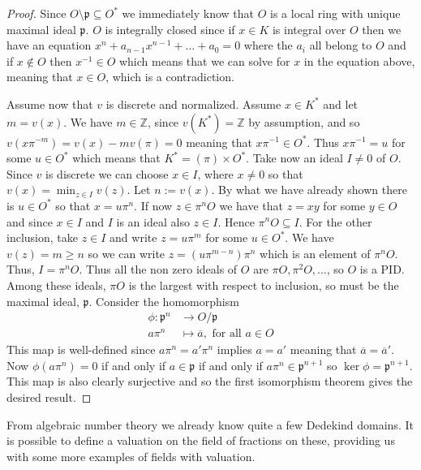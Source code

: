 \documentclass{article}
\newcommand{\mfrak}[1]{\mathfrak{#1}}
\newcommand{\mbb}[1]{\mathbb{#1}}
\numberwithin{equation}{section}
\begin{document}
\begin{proof}
    Since $O \setminus \mfrak p \subseteq O^*$ we immediately know that $O$ is a local ring with unique maximal ideal $\mfrak p$.   $O$ is integrally closed since if $x \in K$ is integral over $O$ then we have an equation $x^n + a_{n-1}x^{n-1} + ... + a_0 = 0$ where the $a_i$ all belong to $O$ and if $x \notin O$ then $x^{-1} \in O$ which means that we can solve for $x$ in the equation above, meaning that $x \in O$, which is a contradiction. 

    Assume now that $v$ is discrete and normalized. Assume $x \in K^*$ and let $m = v(x)$. We have $m \in \mbb Z$, since $v(K^*) = \mbb Z$ by assumption, and so $v(x \pi^{-m}) = v(x) - mv(\pi) = 0$ meaning that $x \pi^{-1} \in O^*$. Thus $x \pi^{-1} = u$ for some $u \in O^*$ which means that $K^* = (\pi) \times O^*$. Take now an ideal $I \neq 0$ of $O$. Since $v$ is discrete we can choose $x \in I$, where $x \neq 0$ so that $v(x) = \min_{z \in I}v(z)$. Let $n := v(x)$. By what we have already shown there is $u \in O^*$ so that $x = u\pi^n$. If now $z \in \pi^n O$ we have that $z = xy$ for some $y \in O$ and since $x \in I$ and $I$ is an ideal also $z \in I$. Hence $\pi^n O \subseteq I$. For the other inclusion, take $z \in I$ and write $z = u \pi^m$ for some $u \in O^*$. We have $v(z) = m \geq n$ so we can write $z = (u \pi^{m-n}) \pi^n$ which is an element of $\pi^n O$. Thus, $I = \pi^n O$. Thus all the non zero ideals of $O$ are $\pi O, \pi^2 O, ...$, so $O$ is a PID. Among these ideals, $\pi O$ is the largest with respect to inclusion, so must be the maximal ideal, $\mfrak p$. Consider the homomorphism
    \begin{align*}
        \phi : \mfrak p^n & \to O / \mfrak p                              \\
        a \pi^n           & \mapsto \overline a, \text{ for all } a \in O
    \end{align*}
    This map is well-defined since $a \pi^n = a' \pi^n$ implies $a = a'$ meaning that $\overline a = \overline a'$. Now $\phi(a \pi^n) = 0$ if and only if $a \in \mfrak p$ if and only if $a \pi^n \in \mfrak p^{n+1}$ so $\ker \phi = \mfrak p^{n+1}$. This map is also clearly surjective and so the first isomorphism theorem gives the desired result.
\end{proof}

From algebraic number theory we already know quite a few Dedekind domains. It is possible to define a valuation on the field of fractions on these, providing us with some more examples of fields with valuation.
\end{document}
